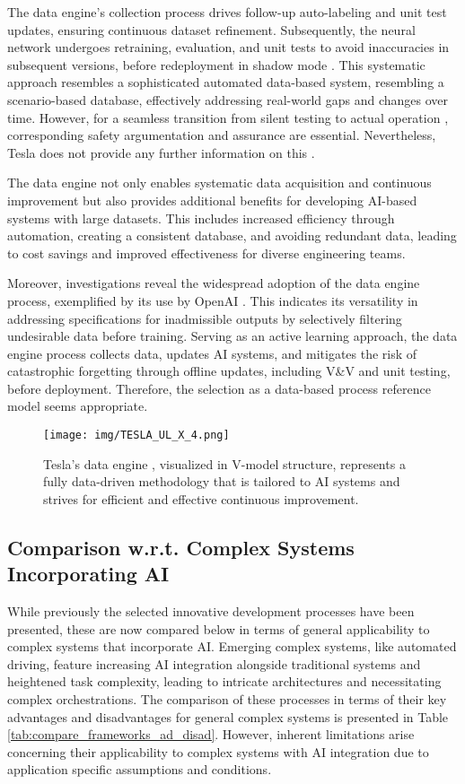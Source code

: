 The data engine's collection process drives follow-up auto-labeling and unit test updates, ensuring continuous dataset refinement. Subsequently, the neural network undergoes retraining, evaluation, and unit tests to avoid inaccuracies in subsequent versions, before redeployment in shadow mode \cite{Tesla_shadow, karpathy_cvpr21}. This systematic approach resembles a sophisticated automated data-based system, resembling a scenario-based database, effectively addressing real-world gaps and changes over time. However, for a seamless transition from silent testing to actual operation \cite{Tesla_shadow}, corresponding safety argumentation and assurance are essential. Nevertheless, Tesla does not provide any further information on this \cite{tesla_safety}.

The data engine not only enables systematic data acquisition and continuous improvement but also provides additional benefits for developing AI-based systems with large datasets. This includes increased efficiency through automation, creating a consistent database, and avoiding redundant data, leading to cost savings and improved effectiveness for diverse engineering teams.

Moreover, investigations reveal the widespread adoption of the data engine process, exemplified by its use by OpenAI \cite{DALLE2}. This indicates its versatility in addressing specifications for inadmissible outputs by selectively filtering undesirable data before training. Serving as an active learning approach, the data engine process collects data, updates AI systems, and mitigates the risk of catastrophic forgetting through offline updates, including V\&V and unit testing, before deployment. Therefore, the selection as a data-based process reference model seems appropriate.

\begin{figure}[]
	\centering	
	\texttt{[image: img/TESLA\_UL\_X\_4.png]}
	\caption{Tesla's data engine \cite{karpathy_cvpr21}, visualized in V-model structure, represents a fully data-driven methodology that is tailored to AI systems and strives for efficient and effective continuous improvement.}
	\label{fig:Tesla}
\end{figure}

\subsection{Comparison w.r.t. Complex Systems Incorporating AI}\label{sec:diff}

While previously the selected innovative development processes have been presented, these are now compared below in terms of general applicability to complex systems that incorporate AI. Emerging complex systems, like automated driving, feature increasing AI integration alongside traditional systems and heightened task complexity, leading to intricate architectures and necessitating complex orchestrations. The comparison of these processes in terms of their key advantages and disadvantages for general complex systems is presented in Table \ref{tab:compare_frameworks_ad_disad}. However, inherent limitations arise concerning their applicability to complex systems with AI integration due to application specific assumptions and conditions.

